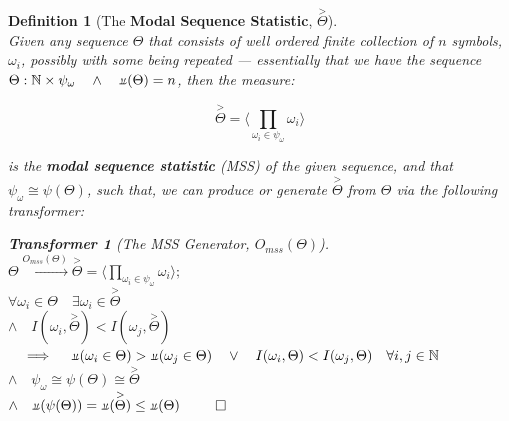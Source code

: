 \documentclass[a4paper, 18pt]{book} %
\newtheorem{defn}{Definition}
\newtheorem{transf}{Transformer}
\newcommand{\invpi}{\rotatebox[origin=c]{180}{$\pi$}}
\begin{document}
{{{ \vspace{2em}
 
\begin{defn}[The \textbf{Modal Sequence Statistic}, $\overset{>}{\Theta}$]
\label{DEFMSSFINb}
$ $\\
Given any sequence $\Theta$ that consists of well ordered finite collection of $n$ symbols, $\omega_i$, possibly with some being repeated --- essentially that we have the sequence $\Theta : \mathbb{N} \times \psi_{\omega} \quad \land \quad \invpi(\Theta) = n$, then the measure:

\vspace{1em}
\begin{equation}
\label{EQMSS}
\overset{>}{\Theta} = \langle \prod\limits_{\omega_i \in \psi_\omega} \omega_i \rangle 
\end{equation}
\vspace{1em}

is the \textbf{modal sequence statistic} (MSS) of the given sequence, and that $\psi_\omega \cong \psi(\Theta)$, such that, we can produce or generate $\overset{>}{\Theta}$ from $\Theta$ via the following transformer:

\vspace{1em}
\begin{transf}[The MSS Generator, $O_{mss}(\Theta)$]
\label{TRANSMSSGENb}
$ $\\
$\Theta \xrightarrow{O_{mss}(\Theta)} \overset{>}{\Theta} = \langle \prod\limits_{\omega_i \in \psi_\omega} \omega_i \rangle ;$\\
$\forall \omega_i \in \Theta \quad \exists \omega_i \in \overset{>}{\Theta}$\\
$\land \quad I(\omega_i,\overset{>}{\Theta}) < I(\omega_j,\overset{>}{\Theta})$\\ 
$\quad \implies \quad \invpi(\omega_i \in \Theta) > \invpi(\omega_j \in \Theta) \quad \lor \quad I(\omega_i,\Theta) < I(\omega_j, \Theta) \quad \forall i,j \in \mathbb{N}$\\
$\land \quad \psi_\omega \cong  \psi(\Theta) \cong \overset{>}{\Theta}$\\
$\land \quad \invpi(\psi(\Theta)) = \invpi(\overset{>}{\Theta}) \leq \invpi(\Theta)$
$\qed$
\end{transf}
\vspace{1em}


\end{defn}
\vspace{2em}
 
}}}
\end{document}
